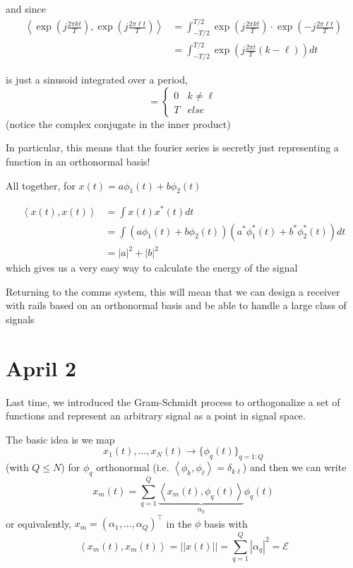 \documentclass[12pt]{report}
\newcommand{\brak}[1]{\left\langle #1 \right\rangle}
\newcommand{\abs}[1]{\left\vert #1 \right\vert}
\newcommand{\norm}[1]{\left\vert \left\vert #1 \right\vert \right\vert}
\newcommand{\Ec}{\mathcal{E}}
\begin{document}
and since 
\begin{align*}
    \brak{\exp\left(j \frac{2\pi k t}{T}\right), \exp\left( j \frac{2\pi \ell t}{T}\right)} &= \int_{-T/2}^{T/2} \exp\left(j \frac{2\pi k t}{T}\right) \cdot \exp\left(- j \frac{2\pi \ell t}{T}\right)\\ 
    &= \int_{-T/2}^{T/2} \exp\left(j \frac{2\pi t}{T} (k -\ell)\right) dt 
\end{align*}

is just a sinusoid integrated over a period, 
\[= \begin{cases}
    0 & k \neq \ell \\
    T & else 
    \end{cases} \]
(notice the complex conjugate in the inner product) 

In particular, this means that the fourier series is secretly just representing a function in an orthonormal basis! 

All together, for $x(t) = a \phi_1(t) + b \phi_2(t) $

\begin{align*}
    \brak{x(t), x(t)} &= \int x(t) x^*(t) dt \\
    &= \int (a \phi_1(t) + b \phi_2(t)) (a^* \phi_1^*(t) + b^* \phi_2^*(t) ) dt \\
    &= \abs{a}^2 + \abs{b}^2
\end{align*}
which gives us a very easy way to calculate the energy of the signal 

Returning to the comms system, this will mean that we can design a receiver with rails based on an orthonormal basis and be able to handle a large class of signals

\section{April 2} 

Last time, we introduced the Gram-Schmidt process to orthogonalize a set of functions and represent an arbitrary signal as a point in signal space.

The basic idea is we map 
\[x_1(t), \dots, x_N(t) \to \{\phi_q(t)\}_{q=1:Q}\]
(with $Q \leq N$) for $\phi_q$ orthonormal (i.e. $\brak{\phi_k, \phi_\ell} = \delta_{k\ell}$) and then we can write 
\[x_m(t) = \sum_{q=1}^Q \underbrace{\brak{x_m(t), \phi_q(t)}}_{\alpha_q} \phi_q(t)\]
or equivalently, $x_m = (\alpha_1, \dots, \alpha_Q)^{\top}$ in the $\phi$ basis with
\[\brak{x_m(t), x_m(t)} = \norm{x(t)} = \sum_{q=1}^Q \abs{\alpha_q}^2 = \Ec\]
\end{document}
